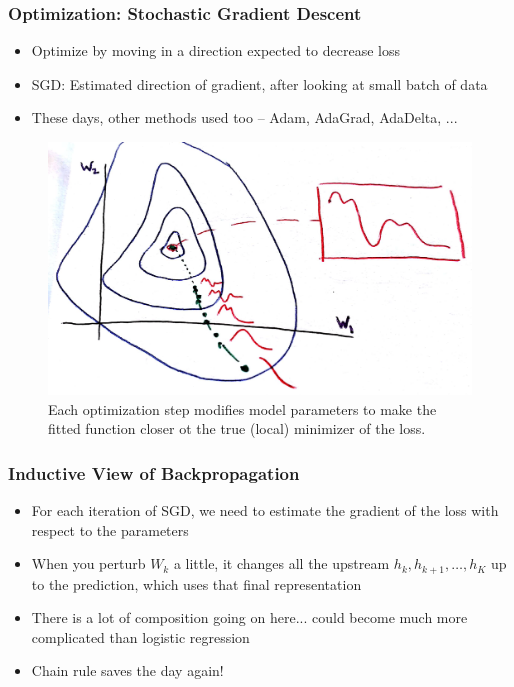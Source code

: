 \documentclass[10pt,mathserif]{beamer}
\begin{document}
\begin{frame}
  \frametitle{Optimization: Stochastic Gradient Descent}
  \begin{itemize}
  \item Optimize by moving in a direction expected to decrease loss
  \item SGD: Estimated direction of gradient, after looking at small batch of
    data
  \item These days, other methods used too -- Adam, AdaGrad, AdaDelta, ...
  \end{itemize}
\begin{figure}[ht]
  \centering
  \includegraphics[width=0.6\paperwidth]{figure/sgd_example}
  \caption{Each optimization step modifies model parameters to make the fitted
    function closer ot the true (local) minimizer of the loss.
    \label{fig:sgd_example} }
\end{figure}
\end{frame}

\begin{frame}
  \frametitle{Inductive View of Backpropagation}
  \begin{itemize}
  \item For each iteration of SGD, we need to estimate the gradient of the loss
    with respect to the parameters
  \item When you perturb $W_k$ a little, it changes all the upstream $h_k, h_{k +
    1}, \dots, h_{K}$ up to the prediction, which uses that final representation
  \item There is a lot of composition going on here... could become much more
    complicated than logistic regression
  \item Chain rule saves the day again!
  \end{itemize}
\end{frame}
\end{document}
